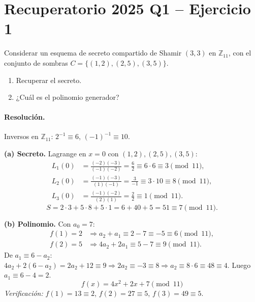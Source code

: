 \documentclass[11pt,a4paper]{article}
\begin{document}
\section{Recuperatorio 2025 Q1 -- Ejercicio 1}
\label{sec:recup2025Q1}

\begin{consignabox}
Considerar un esquema de secreto compartido de Shamir $(3,3)$ en $\mathbb{Z}_{11}$, con el conjunto de sombras $C = \{(1,2),(2,5),(3,5)\}$.
\begin{enumerate}
  \item[a)] Recuperar el secreto.
  \item[b)] ¿Cuál es el polinomio generador?
\end{enumerate}
\end{consignabox}

\paragraph{Resolución.}
Inversos en $\mathbb{Z}_{11}$: $2^{-1}\equiv 6$, $(-1)^{-1}\equiv 10$.

\textbf{(a) Secreto.} Lagrange en $x=0$ con $(1,2),(2,5),(3,5)$:
\begin{align*}
  L_1(0) &= \frac{(-2)(-3)}{(-1)(-2)} = \frac{6}{2} \equiv 6\cdot 6 \equiv 3 \pmod{11},\\
  L_2(0) &= \frac{(-1)(-3)}{(1)(-1)} = \frac{3}{-1} \equiv 3\cdot 10 \equiv 8 \pmod{11},\\
  L_3(0) &= \frac{(-1)(-2)}{(2)(1)} = \frac{2}{2} \equiv 1 \pmod{11}.
\end{align*}
\[
  S = 2\cdot 3 + 5\cdot 8 + 5\cdot 1 = 6 + 40 + 5 = 51 \equiv \boxed{7} \pmod{11}.
\]

\textbf{(b) Polinomio.} Con $a_0=7$:
\begin{align*}
  f(1)=2 &\Rightarrow a_2 + a_1 \equiv 2-7 \equiv -5 \equiv 6 \pmod{11},\\
  f(2)=5 &\Rightarrow 4a_2 + 2a_1 \equiv 5-7 \equiv 9 \pmod{11}.
\end{align*}
De $a_1\equiv 6-a_2$: $4a_2+2(6-a_2)=2a_2+12\equiv 9 \Rightarrow 2a_2\equiv -3\equiv 8 \Rightarrow a_2\equiv 8\cdot 6\equiv 48\equiv 4$. Luego $a_1\equiv 6-4=2$.
\[
  \boxed{f(x) = 4x^2 + 2x + 7 \pmod{11}}
\]
\emph{Verificación:} $f(1)=13\equiv 2$, $f(2)=27\equiv 5$, $f(3)=49\equiv 5$. \checkmark
\end{document}
